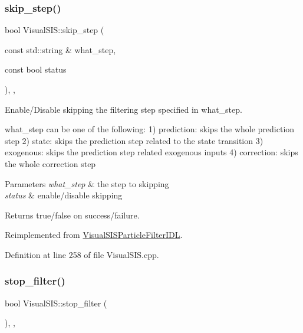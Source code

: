 \subsubsection{\texorpdfstring{skip\+\_\+step()}{skip\_step()}}
{\footnotesize\ttfamily bool Visual\+S\+I\+S\+::skip\+\_\+step (\begin{DoxyParamCaption}\item[{const std\+::string \&}]{what\+\_\+step,  }\item[{const bool}]{status }\end{DoxyParamCaption})\hspace{0.3cm}{\ttfamily [override]}, {\ttfamily [protected]}, {\ttfamily [virtual]}}



Enable/\+Disable skipping the filtering step specified in what\+\_\+step. 

what\+\_\+step can be one of the following\+: 1) prediction\+: skips the whole prediction step 2) state\+: skips the prediction step related to the state transition 3) exogenous\+: skips the prediction step related exogenous inputs 4) correction\+: skips the whole correction step 
\begin{DoxyParams}{Parameters}
{\em what\+\_\+step} & the step to skipping \\
\hline
{\em status} & enable/disable skipping \\
\hline
\end{DoxyParams}
\begin{DoxyReturn}{Returns}
true/false on success/failure. 
\end{DoxyReturn}


Reimplemented from \hyperlink{classVisualSISParticleFilterIDL_a09d343c25082f2056546c6e95d397eaf}{Visual\+S\+I\+S\+Particle\+Filter\+I\+DL}.



Definition at line 258 of file Visual\+S\+I\+S.\+cpp.

\mbox{\label{classVisualSIS_a8e111a001d0dd201a5f661c9ff226bc1}} 
\subsubsection{\texorpdfstring{stop\+\_\+filter()}{stop\_filter()}}
{\footnotesize\ttfamily bool Visual\+S\+I\+S\+::stop\+\_\+filter (\begin{DoxyParamCaption}{ }\end{DoxyParamCaption})\hspace{0.3cm}{\ttfamily [override]}, {\ttfamily [protected]}, {\ttfamily [virtual]}}



